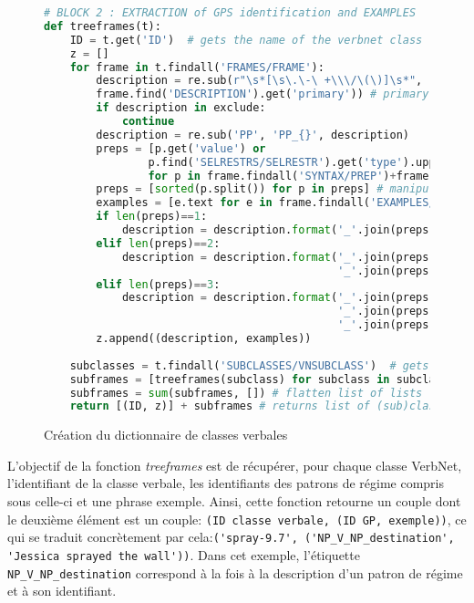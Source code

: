 \begin{figure}[htb]
  \caption{Création du dictionnaire de classes verbales}
	\label{fig:archivn-bloc2}
\begin{lstlisting}[language=Python]
# BLOCK 2 : EXTRACTION of GPS identification and EXAMPLES
def treeframes(t):
    ID = t.get('ID')  # gets the name of the verbnet class
    z = []            
    for frame in t.findall('FRAMES/FRAME'):
        description = re.sub(r"\s*[\s\.\-\ +\\\/\(\)]\s*", '_',  
        frame.find('DESCRIPTION').get('primary')) # primary description = identification of a GP
        if description in exclude:
            continue
        description = re.sub('PP', 'PP_{}', description) 
        preps = [p.get('value') or 
                p.find('SELRESTRS/SELRESTR').get('type').upper()                  
                for p in frame.findall('SYNTAX/PREP')+frame.findall('SYNTAX/LEX')] 
        preps = [sorted(p.split()) for p in preps] # manipulates data to insert the prep. in desc.                                
        examples = [e.text for e in frame.findall('EXAMPLES/EXAMPLE')] # get ex. for each desc.
        if len(preps)==1:
            description = description.format('_'.join(preps[0]))
        elif len(preps)==2:
            description = description.format('_'.join(preps[0]),
                                             '_'.join(preps[1]))
        elif len(preps)==3:
            description = description.format('_'.join(preps[0]), 
                                             '_'.join(preps[1]), 
                                             '_'.join(preps[2])) # inserting preps in descriptions
        z.append((description, examples))
        
    subclasses = t.findall('SUBCLASSES/VNSUBCLASS')  # gets the root of each subclasses
    subframes = [treeframes(subclass) for subclass in subclasses] # applies function to subclasses
    subframes = sum(subframes, []) # flatten list of lists
    return [(ID, z)] + subframes # returns list of (sub)class, GP-identification and example
\end{lstlisting}
\end{figure}

L'objectif de la fonction \emph{treeframes} est de récupérer, pour chaque classe VerbNet, l'identifiant de la classe verbale, les identifiants des patrons de régime compris sous celle-ci et une phrase exemple. Ainsi, cette fonction retourne un couple dont le deuxième élément est un couple: \texttt{(ID classe verbale, (ID \ac{GP}, exemple))}, ce qui se traduit concrètement par cela:\lstinline|('spray-9.7', ('NP_V_NP_destination', 'Jessica sprayed the wall'))|. Dans cet exemple, l'étiquette \lstinline|NP_V_NP_destination| correspond à la fois à la description d'un patron de régime et à son identifiant.

